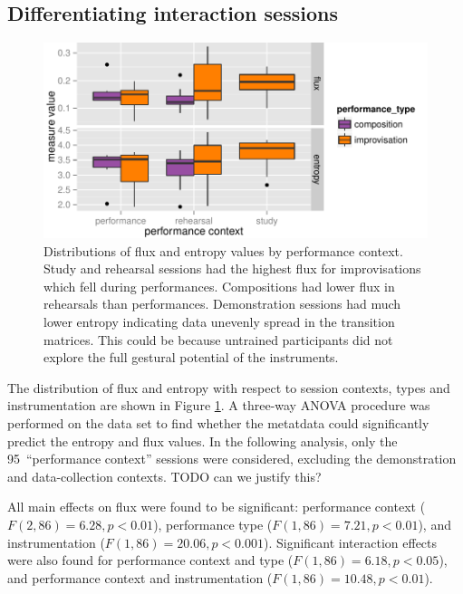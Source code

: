 \documentclass{sigchi}
\begin{document}
\subsection{Differentiating interaction sessions}
\label{differentiating-interaction-sessions}

\begin{figure} \centering
  \includegraphics[width=\linewidth]{figures/context-flux-entropy-boxplot}
  \caption{Distributions of flux and entropy values by performance
context. Study and rehearsal sessions had the highest flux for
improvisations which fell during performances. Compositions had lower
flux in rehearsals than performances. Demonstration sessions had much
lower entropy indicating data unevenly spread in the transition
matrices. This could be because untrained participants did not explore
the full gestural potential of the instruments.
\label{fig:flux-entropy-boxplot}}
\end{figure}

The distribution of flux and entropy with respect to session contexts,
types and instrumentation are shown in Figure
\ref{fig:flux-entropy-boxplot}. A three-way ANOVA procedure was
performed on the data set to find whether the metatdata could
significantly predict the entropy and flux values.
In the following analysis, only the 95~``performance context''
sessions were considered, excluding the demonstration and
data-collection contexts. TODO can we justify this?

All main effects on flux were found to be significant: performance
context ($F(2,86) = 6.28, p < 0.01$), performance type
($F(1,86) = 7.21, p < 0.01$), and instrumentation
($F(1,86) = 20.06, p < 0.001$). Significant interaction effects were
also found for performance context and type
($F(1,86) = 6.18, p < 0.05$), and performance context and
instrumentation ($F(1,86) = 10.48, p < 0.01$).
\end{document}
